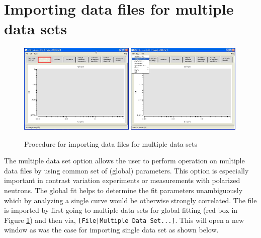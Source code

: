\section{Importing data files for multiple data sets}
\begin{figure}[htb]
\centering
    \includegraphics[width=0.49\textwidth]{QTloadingMultipleDS1.png}
    \includegraphics[width=0.49\textwidth]{QTloadingMultipleDS2.png}
\caption{Procedure for importing data files for multiple data sets}
\label{fig:QTmergeMultipleDS1}
\end{figure}
The multiple data set option allows the user to perform operation on
multiple data files by using common set of (global) parameters. This
option is especially important in contrast variation experiments or
measurements with polarized neutrons. The global fit helps to
determine the fit parameters unambiguously which by analyzing a
single curve would be otherwise strongly correlated. The file is
imported by first going to multiple data sets for global fitting
(red box in Figure \ref{fig:QTmergeMultipleDS1}) and then via,
\verb"[File|Multiple Data Set...]". This will open a new window
as was the case for importing single data set
as shown below.
